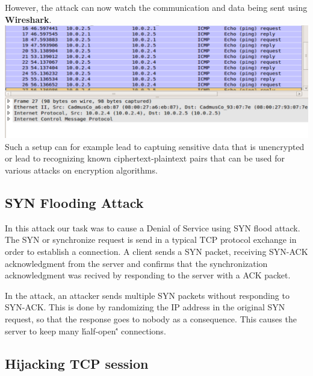 \documentclass[12pt, a4paper, pdflatex]{article}
\begin{document}
However, the attack can now watch the communication and data being sent using \textbf{Wireshark}.\\

\includegraphics[width=.95\textwidth]{gfx/imcp-shark}\\

Such a setup can for example lead to captuing sensitive data that is unencrypted or lead to recognizing known ciphertext-plaintext pairs that can be used for various attacks on encryption algorithms.




\subsection{SYN Flooding Attack}

In this attack our task was to cause a Denial of Service using SYN flood attack. The SYN or synchronize request is send in a typical TCP protocol exchange in order to establish a connection. A client sends a SYN packet, receiving SYN-ACK acknowledgment from the server and confirms that the synchronization acknowledgment was recived by responding to the server with a ACK packet.

In the attack, an attacker sends multiple SYN packets without responding to SYN-ACK. This is done by randomizing the IP address in the original SYN request, so that the response goes to nobody as a consequence. This causes the server to keep many \'half-open\'' connections.

\subsection{Hijacking TCP session}
\end{document}
